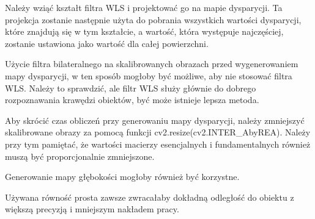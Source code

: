 \documentclass[magisterska]{pracadypl}
\begin{document}
Należy wziąć kształt filtra WLS i projektować go na mapie dysparycji. Ta projekcja zostanie następnie użyta do pobrania wszystkich wartości dysparycji, które znajdują się w tym kształcie, a wartość, która występuje najczęściej, zostanie ustawiona jako wartość dla całej powierzchni.

Użycie filtra bilateralnego na skalibrowanych obrazach przed wygenerowaniem mapy dysparycji, w ten sposób mogłoby być możliwe, aby nie stosować filtra WLS. Należy to sprawdzić, ale filtr WLS służy głównie do dobrego rozpoznawania krawędzi obiektów, być może istnieje lepsza metoda.

Aby skrócić czas obliczeń przy generowaniu mapy dysparycji, należy zmniejszyć skalibrowane obrazy za pomocą funkcji cv2.resize(cv2.INTER\_AbyREA). Należy przy tym pamiętać, że wartości macierzy esencjalnych i fundamentalnych również muszą być proporcjonalnie zmniejszone.

Generowanie mapy głębokości mogłoby również być korzystne.

Używana równość prosta zawsze zwracałaby dokładną odległość do obiektu z większą precyzją i mniejszym nakładem pracy.

\renewcommand{\listfigurename}{Spis rysunków}
\listoffigures
\end{document}
